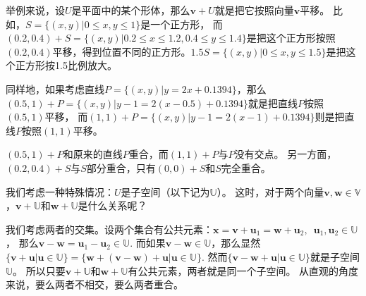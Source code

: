 \documentclass[12pt,UTF8,fontset=none]{ctexbook}
\begin{document}
举例来说，设$U$是平面中的某个形体，那么$\mathbf{v} + U$就是把它按照向量$\mathbf{v}$平移。
比如，$S = \{(x,y) | 0 \leqslant x, y \leqslant 1\}$是一个正方形，
而$(0.2, 0.4) + S = \{(x,y) | 0.2 \leqslant x \leqslant 1.2, 0.4 \leqslant y \leqslant 1.4\}$是把这个正方形按照$(0.2, 0.4)$平移，得到位置不同的正方形。$1.5 S = \{(x,y) | 0 \leqslant x, y \leqslant 1.5\}$是把这个正方形按1.5比例放大。

同样地，如果考虑直线$P = \{(x,y) | y = 2 x + 0.1394\}$，那么$(0.5, 1) + P = \{(x,y) | y - 1 = 2 (x - 0.5) + 0.1394\}$就是把直线$P$按照$(0.5, 1)$平移，
而$(1, 1) + P = \{(x,y) | y - 1 = 2 (x - 1) + 0.1394\}$则是把直线$P$按照$(1, 1)$平移。

$(0.5, 1) + P$和原来的直线$P$重合，而$(1, 1) + P$与$P$没有交点。
另一方面，$(0.2, 0.4) + S$与$S$部分重合，只有$(0, 0) + S$和$S$完全重合。

我们考虑一种特殊情况：$U$是子空间（以下记为$\mathbb{U}$）。
这时，对于两个向量$\mathbf{v}, \mathbf{w} \in \mathbb{V}$，$\mathbf{v} + \mathbb{U}$和$\mathbf{w} + \mathbb{U}$是什么关系呢？

我们考虑两者的交集。设两个集合有公共元素：$\mathbf{x} = \mathbf{v} + \mathbf{u}_1 = \mathbf{w} + \mathbf{u}_2, \,\,\, \mathbf{u}_1, \mathbf{u}_2 \in \mathbb{U}$，
那么$\mathbf{v} - \mathbf{w} = \mathbf{u}_1 - \mathbf{u}_2 \in \mathbb{U}$. 
而如果$\mathbf{v} - \mathbf{w} \in \mathbb{U}$，那么显然$\{\mathbf{v} + \mathbf{u} | \mathbf{u} \in \mathbb{U}\} = \{\mathbf{w} +  (\mathbf{v} - \mathbf{w}) + \mathbf{u} | \mathbf{u} \in \mathbb{U}\}.$ 
然而$\{\mathbf{v} - \mathbf{w} + \mathbf{u} | \mathbf{u} \in \mathbb{U}\}$就是子空间$\mathbb{U}$。
所以只要$\mathbf{v} + \mathbb{U}$和$\mathbf{w} + \mathbb{U}$有公共元素，两者就是同一个子空间。
从直观的角度来说，要么两者不相交，要么两者重合。
\end{document}
